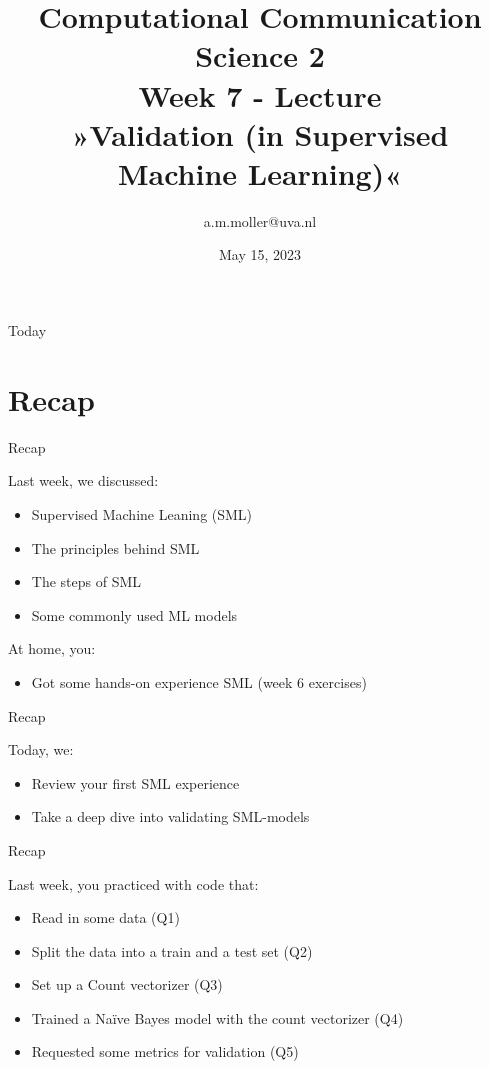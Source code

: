 \documentclass[compress]{beamer}
\title[Computational Communication Science 2]{\textbf{Computational Communication Science 2} \\Week 7 - Lecture\\ »Validation (in Supervised Machine Learning)«}
\author[Marthe Möller]{a.m.moller@uva.nl}
\date{May 15, 2023}
\institute[Digital Society Minor, University of Amsterdam]{Digital Society Minor, University of Amsterdam}
\begin{document}
	
	\begin{frame}{}
		\titlepage
	\end{frame}
	
	\begin{frame}{Today}
		\begin{tiny}
			\tableofcontents
		\end{tiny}
	\end{frame}


\section{Recap}

\begin{frame}[fragile]{Recap} 
	
\begin{alertblock}{Last week, we discussed:}
\begin{itemize}
	\item Supervised Machine Leaning (SML)
	\item The principles behind SML
	\item The steps of SML
	\item Some commonly used ML models
\end{itemize}
\end{alertblock}
	
\begin{alertblock}{At home, you:}
\begin{itemize}
	\item Got some hands-on experience SML (week 6 exercises)
\end{itemize}
\end{alertblock}	
\end{frame}


\begin{frame}[fragile]{Recap} 
\begin{alertblock}{Today, we:}
\begin{itemize}
	\item Review your first SML experience
	\item  Take a deep dive into validating SML-models
\end{itemize}
\end{alertblock}
	
\end{frame}


\begin{frame}[fragile]{Recap} 
	
\begin{alertblock}{Last week, you practiced with code that:}
\begin{itemize}
	\item Read in some data (Q1)
 	\item Split the data into a train and a test set (Q2)
	\item Set up a Count vectorizer (Q3)
	\item Trained a Naïve Bayes model with the count vectorizer (Q4)
	\item Requested some metrics for validation (Q5)
\end{itemize}
\end{alertblock}

\end{frame}
\end{document}
